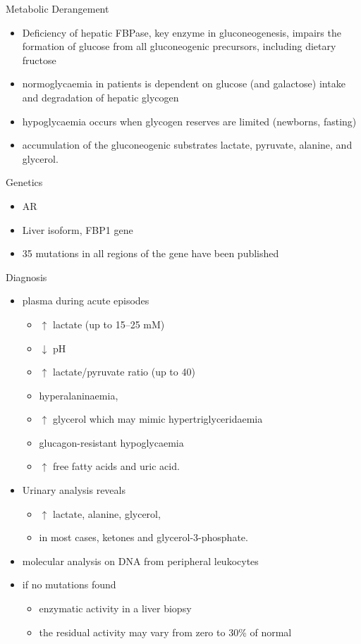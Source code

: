 \documentclass[presentation, smaller]{beamer}
\begin{document}
\begin{frame}[label={sec:org1256596}]{Metabolic Derangement}
\begin{itemize}
\item Deficiency of hepatic FBPase, key enzyme in gluconeogenesis, impairs
the formation of glucose from all gluconeogenic precursors, including dietary fructose
\item normoglycaemia in patients is dependent on glucose (and galactose)
intake and degradation of hepatic glycogen
\item hypoglycaemia occurs when glycogen reserves are limited (newborns, fasting)
\item accumulation of the gluconeogenic substrates lactate, pyruvate, alanine, and glycerol.
\end{itemize}
\end{frame}
\begin{frame}[label={sec:orgd7e5339}]{Genetics}
\begin{itemize}
\item AR
\item Liver isoform, FBP1 gene
\item 35 mutations in all regions of the gene have been published
\end{itemize}
\end{frame}

\begin{frame}[label={sec:org2924a99}]{Diagnosis}
\begin{itemize}
\item plasma during acute episodes
\begin{itemize}
\item \(\uparrow\) lactate (up to 15–25 mM)
\item \(\downarrow\) pH
\item \(\uparrow\) lactate/pyruvate ratio (up to 40)
\item hyperalaninaemia,
\item \(\uparrow\) glycerol which may mimic hypertriglyceridaemia
\item glucagon-resistant hypoglycaemia
\item \(\uparrow\) free fatty acids and uric acid.
\end{itemize}
\item Urinary analysis reveals
\begin{itemize}
\item \(\uparrow\) lactate, alanine, glycerol,
\item in most cases, ketones and glycerol-3-phosphate.
\end{itemize}

\item molecular analysis on DNA from peripheral leukocytes
\item if no mutations found
\begin{itemize}
\item enzymatic activity in a liver biopsy
\item the residual activity may vary from zero to 30\% of normal
\end{itemize}
\end{itemize}
\end{frame}
\end{document}
